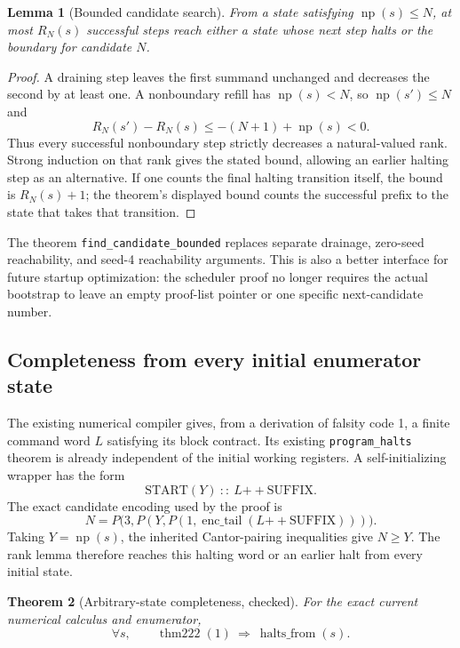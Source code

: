 \documentclass[11pt]{article}
\newtheorem{theorem}{Theorem}[section]
\newtheorem{lemma}[theorem]{Lemma}
\newcommand{\np}{\operatorname{np}}
\newcommand{\code}[1]{\texttt{#1}}
\begin{document}
\begin{lemma}[Bounded candidate search]
From a state satisfying $\np(s)\le N$, at most $R_N(s)$ successful steps reach either a state whose next step halts or the boundary for candidate $N$.
\end{lemma}
\begin{proof}
A draining step leaves the first summand unchanged and decreases the second by at least one. A nonboundary refill has $\np(s)<N$, so $\np(s')\le N$ and
\[
 R_N(s')-R_N(s)
 \le -(N+1)+\np(s)<0.
\]
Thus every successful nonboundary step strictly decreases a natural-valued rank. Strong induction on that rank gives the stated bound, allowing an earlier halting step as an alternative. If one counts the final halting transition itself, the bound is $R_N(s)+1$; the theorem's displayed bound counts the successful prefix to the state that takes that transition.
\end{proof}

The theorem \code{find\_candidate\_bounded} replaces separate drainage, zero-seed reachability, and seed-4 reachability arguments. This is also a better interface for future startup optimization: the scheduler proof no longer requires the actual bootstrap to leave an empty proof-list pointer or one specific next-candidate number.

\subsection{Completeness from every initial enumerator state}

The existing numerical compiler gives, from a derivation of falsity code 1, a finite command word $L$ satisfying its block contract. Its existing \code{program\_halts} theorem is already independent of the initial working registers. A self-initializing wrapper has the form
\[
 \mathrm{START}(Y)\ ::\ L\mathbin{+\!+}\mathrm{SUFFIX}.
\]
The exact candidate encoding used by the proof is
\[
 N=P\bigl(3,P(Y,P(1,\operatorname{enc\_tail}(L\mathbin{+\!+}\mathrm{SUFFIX})))\bigr).
\]
Taking $Y=\np(s)$, the inherited Cantor-pairing inequalities give $N\ge Y$. The rank lemma therefore reaches this halting word or an earlier halt from every initial state.

\begin{theorem}[Arbitrary-state completeness, checked]
For the exact current numerical calculus and enumerator,
\[
 \forall s,\qquad \operatorname{thm222}(1)\ \Longrightarrow\
 \operatorname{halts\_from}(s).
\]
\end{theorem}
\end{document}
